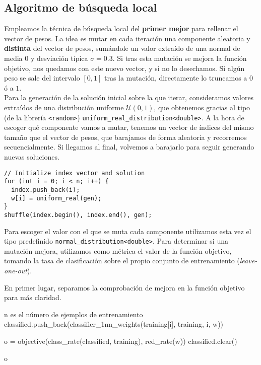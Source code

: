 \documentclass[12pt]{article}
\begin{document}
\subsection*{Algoritmo de búsqueda local}

Empleamos la técnica de búsqueda local del \textbf{primer mejor} para rellenar el vector de pesos. La idea es mutar en cada iteración una componente aleatoria y \textbf{distinta} del vector de pesos, sumándole un valor extraído de una normal de media $0$ y desviación típica $\sigma = 0.3$. Si tras esta mutación se mejora la función objetivo, nos quedamos con este nuevo vector, y si no lo desechamos. Si algún peso se sale del intervalo $[0,1]$ tras la mutación, directamente lo truncamos a $0$ ó a $1$.\\

Para la generación de la solución inicial sobre la que iterar, consideramos valores extraídos de una distribución uniforme $\mathcal U(0,1)$, que obtenemos gracias al tipo (de la librería \verb|<random>|) \verb|uniform_real_distribution<double>|. A la hora de escoger qué componente vamos a mutar, tenemos un vector de índices del mismo tamaño que el vector de pesos, que barajamos de forma aleatoria y recorremos secuencialmente. Si llegamos al final, volvemos a barajarlo para seguir generando nuevas soluciones.

\begin{verbatim}
// Initialize index vector and solution
for (int i = 0; i < n; i++) {
  index.push_back(i);
  w[i] = uniform_real(gen);
}
shuffle(index.begin(), index.end(), gen);
\end{verbatim}

Para escoger el valor con el que se muta cada componente utilizamos esta vez el tipo predefinido \verb|normal_distribution<double>|. Para determinar si una mutación mejora, utilizamos como métrica el valor de la función objetivo, tomando la tasa de clasificación sobre el propio conjunto de entrenamiento (\textit{leave-one-out}).

\newpage

En primer lugar, separamos la comprobación de mejora en la función objetivo para más claridad.

\begin{algorithm}[ht]
\begin{algorithmic}

  \Comment n es el número de ejemplos de entrenamiento
    \State classified.push\_back(classifier\_1nn\_weights(training[i], training, i, w))
\EndFor

  \State o = objective(class\_rate(classified, training), red\_rate(w))
  \State classified.clear()
  
\hspace{-.7em} \Return o

\end{algorithmic}
\end{algorithm}
\end{document}
